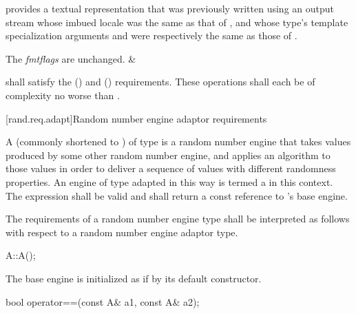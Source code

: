 \begin{libreqtab4d}
    \requires
     provides a textual representation
    that was previously written
    using an output stream
    whose imbued locale
    was the same as that of ,
    and whose type's template specialization arguments
     and 
    were respectively the same as those of .

    \ensures The \textit{fmtflags} are unchanged.
  & 
  \\
\end{libreqtab4d}

\pnum
{} shall satisfy the
 ()
and  () requirements.
These operations shall each be of complexity
no worse than .


%



[rand.req.adapt]{Random number engine adaptor requirements}%

\pnum
A 
(commonly shortened to )
 of type 
is a random number engine
that takes values
produced by some other random number engine,
and applies an algorithm to those values
in order to deliver a sequence of values
with different randomness properties.
An engine  of type  adapted in this way
is termed a 
in this context.
The expression  shall be valid and shall return a
const reference to 's base engine.

\pnum
The requirements of a random number engine type
shall be interpreted as follows
with respect to a random number engine adaptor type.

\begin{itemdecl}
A::A();
\end{itemdecl}

\begin{itemdescr}
\pnum\effects
 The base engine is initialized
 as if by its default constructor.
\end{itemdescr}

\begin{itemdecl}
bool operator==(const A& a1, const A& a2);
\end{itemdecl}

